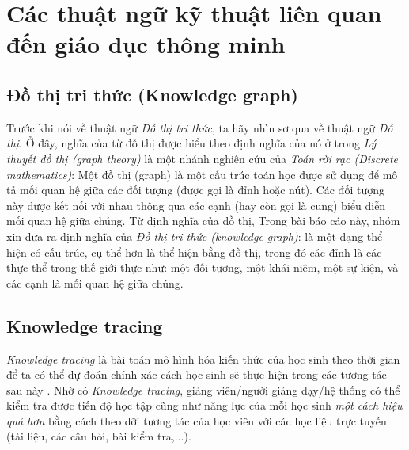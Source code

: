 \section{Các thuật ngữ kỹ thuật liên quan đến giáo dục thông minh}
\subsection{Đồ thị tri thức (Knowledge graph)}
Trước khi nói về thuật ngữ \emph{Đồ thị tri thức}, ta hãy nhìn sơ qua về thuật ngữ \emph{Đồ thị}. Ở đây, nghĩa của từ đồ thị được hiểu theo định nghĩa của nó ở trong \emph{Lý thuyết đồ thị (graph theory)} là một nhánh nghiên cứu của \emph{Toán rời rạc (Discrete mathematics)}: Một đồ thị (graph) là một cấu trúc toán học được sử dụng để mô tả mối quan hệ giữa các đối tượng (được gọi là đỉnh hoặc nút). Các đối tượng này được kết nối với nhau thông qua các cạnh (hay còn gọi là cung) biểu diễn mối quan hệ giữa chúng. Từ định nghĩa của đồ thị, Trong bài báo cáo này, nhóm xin đưa ra định nghĩa của \emph{Đồ thị tri thức (knowledge graph)}: là một dạng thể hiện có cấu trúc, cụ thể hơn là thể hiện bằng đồ thị, trong đó các đỉnh là các thực thể trong thế giới thực như: một đối tượng, một khái niệm, một sự kiện, và các cạnh là mối quan hệ giữa chúng\cite{ibm_knowledge_graph}.
\subsection{Knowledge tracing}
\emph{Knowledge tracing} là bài toán mô hình hóa kiến thức của học sinh theo thời gian để ta có thể dự đoán chính xác cách học sinh sẽ thực hiện trong các tương tác sau này \cite{10.5555/2969239.2969296}. Nhờ có \emph{Knowledge tracing}, giảng viên/người giảng dạy/hệ thống có thể kiểm tra được tiến độ học tập cũng như năng lực của mỗi học sinh \emph{một cách hiệu quả hơn} bằng cách theo dỡi tương tác của học viên với các học liệu trực tuyến (tài liệu, các câu hỏi, bài kiểm tra,...)\cite{10.1145/3569576}.\\
